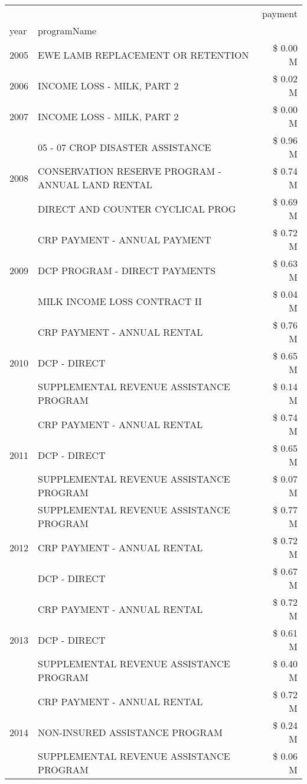 \begin{tabular}{llr}
\toprule
 &  & payment \\
year & programName &  \\
\midrule
2005 & EWE LAMB REPLACEMENT OR RETENTION & \$ 0.00 M \\
\cline{1-3}
2006 & INCOME LOSS - MILK, PART 2 & \$ 0.02 M \\
\cline{1-3}
2007 & INCOME LOSS - MILK, PART 2 & \$ 0.00 M \\
\cline{1-3}
\multirow[t]{3}{*}{2008} & 05 - 07 CROP DISASTER ASSISTANCE & \$ 0.96 M \\
 & CONSERVATION RESERVE PROGRAM - ANNUAL LAND RENTAL & \$ 0.74 M \\
 & DIRECT AND COUNTER CYCLICAL PROG & \$ 0.69 M \\
\cline{1-3}
\multirow[t]{3}{*}{2009} & CRP PAYMENT - ANNUAL PAYMENT & \$ 0.72 M \\
 & DCP PROGRAM - DIRECT PAYMENTS & \$ 0.63 M \\
 & MILK INCOME LOSS CONTRACT II & \$ 0.04 M \\
\cline{1-3}
\multirow[t]{3}{*}{2010} & CRP PAYMENT - ANNUAL RENTAL & \$ 0.76 M \\
 & DCP - DIRECT & \$ 0.65 M \\
 & SUPPLEMENTAL REVENUE ASSISTANCE PROGRAM & \$ 0.14 M \\
\cline{1-3}
\multirow[t]{3}{*}{2011} & CRP PAYMENT - ANNUAL RENTAL & \$ 0.74 M \\
 & DCP - DIRECT & \$ 0.65 M \\
 & SUPPLEMENTAL REVENUE ASSISTANCE PROGRAM & \$ 0.07 M \\
\cline{1-3}
\multirow[t]{3}{*}{2012} & SUPPLEMENTAL REVENUE ASSISTANCE PROGRAM & \$ 0.77 M \\
 & CRP PAYMENT - ANNUAL RENTAL & \$ 0.72 M \\
 & DCP - DIRECT & \$ 0.67 M \\
\cline{1-3}
\multirow[t]{3}{*}{2013} & CRP PAYMENT - ANNUAL RENTAL & \$ 0.72 M \\
 & DCP - DIRECT & \$ 0.61 M \\
 & SUPPLEMENTAL REVENUE ASSISTANCE PROGRAM & \$ 0.40 M \\
\cline{1-3}
\multirow[t]{3}{*}{2014} & CRP PAYMENT - ANNUAL RENTAL & \$ 0.72 M \\
 & NON-INSURED ASSISTANCE PROGRAM & \$ 0.24 M \\
 & SUPPLEMENTAL REVENUE ASSISTANCE PROGRAM & \$ 0.06 M \\
\cline{1-3}

\end{tabular}
